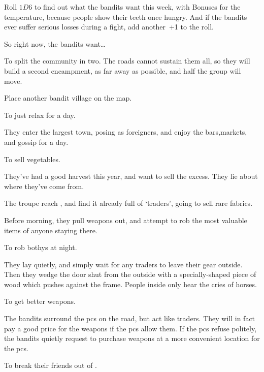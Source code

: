\begin{multicols}{2}

Roll $1D6$ to find out what the bandits want this week, with Bonuses for the temperature, because people show their teeth once hungry.
And if the bandits ever suffer serious losses during a fight, add another~+1 to the roll.

So right now, the bandits want\ldots

\begin{dlist}
  \item
  To split the community in two.
  The roads cannot sustain them all, so they will build a second encampment, as far away as possible, and half the group will move.

  Place another bandit \gls{village} on the map.
  \item
  To just relax for a day.

  They enter the largest town, posing as foreigners, and enjoy the bars,markets, and gossip for a day.
  \item
  To sell vegetables.

  They've had a good harvest this year, and want to sell the excess.
  They lie about where they've come from.
  \item
  The troupe reach , and find it already full of `traders', going to sell rare fabrics.

  Before morning, they pull weapons out, and attempt to rob the most valuable items of anyone staying there.
  \item
  To rob \glspl{bothy} at night.

  They lay quietly, and simply wait for any traders to leave their gear outside.
  Then they wedge the door shut from the outside with a specially-shaped piece of wood which pushes against the frame.
  People inside only hear the cries of horses.
  \item
  To get better weapons.

  The bandits surround the \glspl{pc} on the road, but act like traders.
  They will in fact pay a good price for the weapons if the \glspl{pc} allow them.
  If the \glspl{pc} refuse politely, the bandits quietly request to purchase weapons at a more convenient location for the \glspl{pc}.
  \item
  To break their friends out of .


\end{dlist}
\end{multicols}
